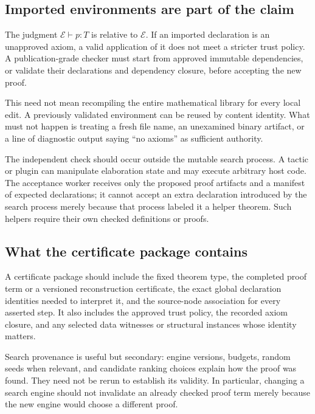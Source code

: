 \documentclass[11pt,letterpaper]{article}
\theoremstyle{definition}
\theoremstyle{remark}
\begin{document}
\subsection{Imported environments are part of the claim}
The judgment $\mathcal E\vdash p:T$ is relative to $\mathcal E$. If an imported declaration is an unapproved axiom, a valid application of it does not meet a stricter trust policy. A publication-grade checker must start from approved immutable dependencies, or validate their declarations and dependency closure, before accepting the new proof.

This need not mean recompiling the entire mathematical library for every local edit. A previously validated environment can be reused by content identity. What must not happen is treating a fresh file name, an unexamined binary artifact, or a line of diagnostic output saying ``no axioms'' as sufficient authority.

The independent check should occur outside the mutable search process. A tactic or plugin can manipulate elaboration state and may execute arbitrary host code. The acceptance worker receives only the proposed proof artifacts and a manifest of expected declarations; it cannot accept an extra declaration introduced by the search process merely because that process labeled it a helper theorem. Such helpers require their own checked definitions or proofs.

\subsection{What the certificate package contains}
A certificate package should include the fixed theorem type, the completed proof term or a versioned reconstruction certificate, the exact global declaration identities needed to interpret it, and the source-node association for every asserted step. It also includes the approved trust policy, the recorded axiom closure, and any selected data witnesses or structural instances whose identity matters.

Search provenance is useful but secondary: engine versions, budgets, random seeds when relevant, and candidate ranking choices explain how the proof was found. They need not be rerun to establish its validity. In particular, changing a search engine should not invalidate an already checked proof term merely because the new engine would choose a different proof.
\end{document}
